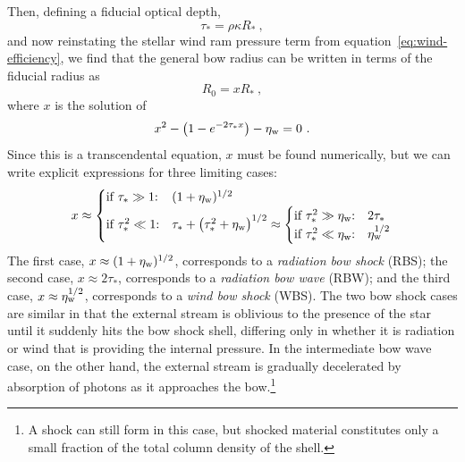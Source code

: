 Then, defining a fiducial optical depth,
\begin{equation}
  \label{eq:tau-star}
  \tau_* = \rho \kappa R_* \ ,
\end{equation}
and now reinstating the stellar wind ram pressure term
from equation~\eqref{eq:wind-efficiency}, we find that the general bow
radius can be written in terms of the fiducial radius as
\begin{equation}
  \label{eq:R0-definition}
  R_0 = x R_* \ ,
\end{equation}
where \(x\) is the solution of
\begin{equation}
  \label{eq:rad-full-x}
  x^2 - \bigl(1 - e^{-2 \tau_* x} \bigr) - \eta_{\text{w}} = 0 \ .
\end{equation}
Since this is a transcendental equation, \(x\) must be found
numerically, but we can write explicit expressions for three limiting
cases:
\begin{equation}
  \label{eq:x-cases}
  x \approx
  \begin{cases}
    \text{if \(\tau_* \gg 1\):} & (1 + \eta_{\text{w}})^{1/2}  \\
    \text{if \(\tau_*^2 \ll 1\):} & \tau_* + \bigl( \tau_*^2 + \eta_{\text{w}} \bigr)^{1/2} \approx
    \begin{cases}
      \text{if \(\tau_*^2 \gg \eta\ensuremath{_{\text{w}}}\):} & 2 \tau_*  \\
      \text{if \(\tau_*^2 \ll \eta\ensuremath{_{\text{w}}}\):} & \eta_{\text{w}}^{1/2} 
    \end{cases}
  \end{cases}
\end{equation}
The first case, \(x \approx (1 + \eta_{\text{w}})^{1/2}\), corresponds to a
\textit{radiation bow shock} (RBS); the second case,
\(x \approx 2 \tau_* \), corresponds to a \textit{radiation bow wave} (RBW);
and the third case, \(x \approx \eta_{\text{w}}^{1/2}\), corresponds to a
\textit{wind bow shock} (WBS).  The two bow shock cases are similar in
that the external stream is oblivious to the presence of the star
until it suddenly hits the bow shock shell, differing only in whether
it is radiation or wind that is providing the internal pressure.  In
the intermediate bow wave case, on the other hand, the external stream
is gradually decelerated by absorption of photons as it approaches the
bow.\footnote{A shock can still form in this case, but shocked
  material constitutes only a small fraction of the total column
  density of the shell.}

